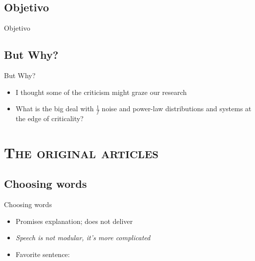 \documentclass[xcolor=x11names,compress]{beamer}
\renewcommand{\(}{\begin{columns}}
\renewcommand{\)}{\end{columns}}
\newcommand{\<}[1]{\begin{column}{#1}}
\renewcommand{\>}{\end{column}}
\begin{document}
\subsection{Objetivo}
\begin{frame}{Objetivo}
    \pause
    \codeFactorialTarget
\end{frame}


\subsection{But Why?}
\begin{frame}{But Why?}
    \begin{itemize}
        \item I thought some of the criticism might graze our research
        \item What is the big deal with $\frac{1}{f}$ noise and power-law distributions and systems at the edge of criticality? 
    \end{itemize}
\end{frame}


\section{\scshape The original articles}

\subsection{Choosing words}
\begin{frame}{Choosing words}

\begin{itemize}
    \item Promises explanation; does not deliver
    \item \emph{Speech is not modular, it's more complicated}
    \item Favorite sentence:
\end{itemize}

\end{frame}

\end{document}
